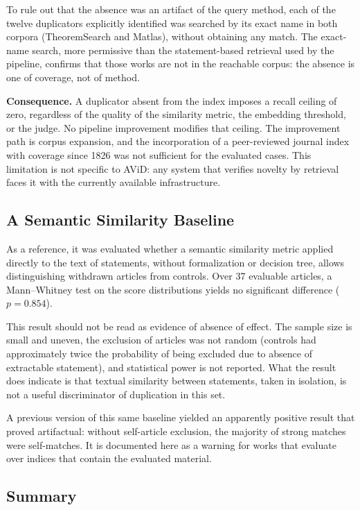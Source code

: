 \documentclass{article}
\theoremstyle{remark}
\begin{document}
To rule out that the absence was an artifact of the query method, each of the twelve duplicators explicitly identified was searched by its exact name in both corpora (TheoremSearch and Matlas), without obtaining any match. The exact-name search, more permissive than the statement-based retrieval used by the pipeline, confirms that those works are not in the reachable corpus: the absence is one of coverage, not of method.

\textbf{Consequence.} A duplicator absent from the index imposes a recall ceiling of zero, regardless of the quality of the similarity metric, the embedding threshold, or the judge. No pipeline improvement modifies that ceiling. The improvement path is corpus expansion, and the incorporation of a peer-reviewed journal index with coverage since 1826 was not sufficient for the evaluated cases. This limitation is not specific to AViD: any system that verifies novelty by retrieval faces it with the currently available infrastructure.

\subsection{A Semantic Similarity Baseline}

As a reference, it was evaluated whether a semantic similarity metric applied directly to the text of statements, without formalization or decision tree, allows distinguishing withdrawn articles from controls. Over 37 evaluable articles, a Mann--Whitney test on the score distributions yields no significant difference ($p = 0.854$).

This result should not be read as evidence of absence of effect. The sample size is small and uneven, the exclusion of articles was not random (controls had approximately twice the probability of being excluded due to absence of extractable statement), and statistical power is not reported. What the result does indicate is that textual similarity between statements, taken in isolation, is not a useful discriminator of duplication in this set.

A previous version of this same baseline yielded an apparently positive result that proved artifactual: without self-article exclusion, the majority of strong matches were self-matches. It is documented here as a warning for works that evaluate over indices that contain the evaluated material.

\subsection{Summary}
\end{document}
